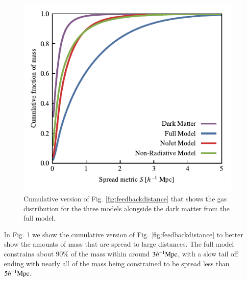 \begin{figure}
    \centering
    \includegraphics{figures/cumulative_histogram_comparison.pdf}
    \vspace{-0.7cm}
    \caption{Cumulative version of Fig. \ref{fig:feedbackdistance} that
    shows the gas distribution for the three models alongside the dark
    matter from the full model.}
    \label{fig:cumulativehistogram}
\end{figure}

In Fig. \ref{fig:cumulativehistogram} we show the cumulative version of Fig.
\ref{fig:feedbackdistance} to better show the amounts of mass that are spread
to large distances. The full model constrains about 90\% of the mass within
around $3h^{-1}{\rm Mpc}{}$, with a slow tail off ending with nearly all of the mass
being constrained to be spread less than $5h^{-1}{\rm Mpc}{}$.

